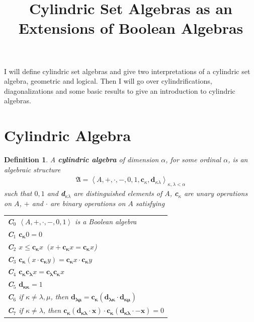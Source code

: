 \documentclass[12pt,a4paper]{article}
\title{Cylindric Set Algebras as an Extensions of Boolean Algebras}
\newtheorem{definition}[theorem]{Definition}
\begin{document}
	

	
\maketitle

I will define cylindric set algebras and give two interpretations of a cylindric set algebra, geometric and logical. Then I will go over cylindrifications, diagonalizations and some basic results to give an introduction to cylindric algebras.

\section{Cylindric Algebra}

\begin{definition}
A \textbf{cylindric algebra} of dimension $\alpha$, for some ordinal $\alpha$, is an algebraic structure 
\begin{align*}
    \mathfrak{A} = \left< A,+,\cdot,-,0,1,\mathbf{c}_\kappa,\mathbf{d}_{\kappa\lambda}\right>_{\kappa,\lambda<\alpha}
\end{align*}
such that $0,1$ and \textbf{d$_{\kappa\lambda}$} are distinguished elements of $A$, \textbf{c$_\kappa$} are unary operations on $A$, $+$ and $\cdot$ are binary operations on $A$ satisfying\\\newline
\begin{tabular}{l}
    \textbf{C}$_0$ $\left<A,+,\cdot,-,0,1\right>$  is a Boolean algebra\\
    \textbf{C}$_1$ $\mathbf{c_\kappa}0 = 0$ \\
    \textbf{C$_2$} $x\le \mathbf{c_\kappa}x \;\;(x+\mathbf{c_\kappa}x=\mathbf{c_\kappa}x$)\\
    \textbf{C$_3$} $\mathbf{c_\kappa}(x\cdot\mathbf{c_\kappa}y)=\mathbf{c_\kappa}x\cdot\mathbf{c_\kappa}y$\\
    \textbf{C$_4$} $\mathbf{c_\kappa}\mathbf{c_\lambda}x=\mathbf{c_\lambda c_\kappa}x$\\
    \textbf{C$_5$} $\mathbf{d_{\kappa\kappa}}=1$\\
    \textbf{C$_6$} if $\kappa\neq\lambda,\mu$, then $\mathbf{d_{\lambda\mu}}=\mathbf{c_\kappa(d_{\lambda\kappa}\cdot d_{\kappa\mu})}$\\
    \textbf{C$_7$} if $\kappa\neq \lambda$, then $\mathbf{c_\kappa(d_{\kappa\lambda}\cdot x)\cdot c_\kappa(d_{\kappa\lambda}\cdot -x)}=0$
\end{tabular}
\end{definition}
\end{document}
